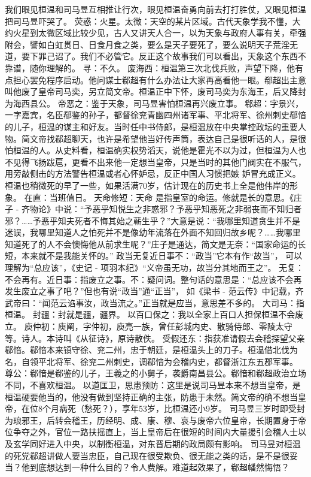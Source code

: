 \documentclass[]{book}
\begin{document}
我们眼见桓温和司马昱互相推让行次，眼见桓温奋勇向前去打打胜仗，又眼见桓温把司马昱吓哭了。
荧惑：火星。太微：天空的某片区域。古代天象学我不懂，大约火星到太微区域比较少见，古人又讲天人合一，以为天象与政府人事有关，牵强附会，譬如白虹贯日、日食月食之类，要么是天子要死了，要么说明天子荒淫无道，要下罪己诏了。我们不必管它。反正这个故事我们可以看出，天象这个东西不靠谱，随你理解的。
寻：不久。
废海西：桓温第三次北伐兵败，声望下降，他有点担心罢免程序启动。他问谋士郗超有什么办法让大家再高看他一眼。郗超出主意叫他废了皇帝司马奕，另立简文帝。桓温正中下怀，废司马奕为东海王，后又降封为海西县公。
帝恶之：鉴于天象，司马昱害怕桓温再兴废立事。
郗超：字景兴，一字嘉宾，名臣郗鉴的孙子，都督徐兖青幽四州诸军事、平北将军、徐州刺史郗愔的儿子，桓温的谋主和好友。当时任中书侍郎，是桓温放在中央掌控政坛的重要人物。简文帝找郗超聊天，也许是希望他当好传声筒，表达自己是很听话的人，是很怕桓温的人。从史料看，桓温确实权势滔天，说他是霍光不以为过，但桓温为人也不见得飞扬跋扈，更看不出来他一定想当皇帝，只是当时的其他门阀实在不服气，用旁敲侧击的方法警告桓温或者心怀妒忌，反正中国人习惯把嫉
妒冒充成正义。桓温也稍微死的早了一些，如果活满70岁，估计现在的历史书上全是他伟岸的形象。
在直：当班值日。 天命修短：天命 是指皇室的命运。修就是长的意思。《庄子 -
齐物论》中说：``予恶乎知悦生之非惑邪？予恶乎知恶死之非弱丧而不知归者邪？\ldots{}\ldots{}予恶乎知夫死者不悔其始之蕲生乎？''大意是说：``我哪里知道贪生并不是迷误，我哪里知道人之怕死并不是像幼年流落在外面不知回归故乡呢？\ldots{}\ldots{}我哪里知道死了的人不会懊悔他从前求生呢？''庄子是通达，简文是无奈：``国家命运的长短，本来就不是我能关怀的。''
政当无复近日事不：``政当''它本有作``故当''，
可以理解为``总应该''，《史记 -
项羽本纪》``义帝虽无功，故当分其地而王之''。
无复：不会再有。近日事：指废立之事。不：疑问词。整句话的意思是：``总应该不会再发生废立之事了吧？''但也有说``政当''通``正当''，
如《梁书 -
范云传》中记载，齐武帝曰：``闻范云谄事汝，政当流之。''正当就是应当，意思差不多的。
大司马：指桓温。 封疆：封就是疆，疆界。
以百口保之：我以全家上百口人担保桓温不会废立。
庾仲初：庾阐，字仲初，庾亮一族，曾任彭城内史、散骑侍郎、零陵太守等。诗人。本诗叫《从征诗》，原诗散佚。
受假还东：指获准请假去会稽探望父亲郗愔。郗愔本来镇守徐、兖二州，忠于朝廷，是桓温头上的刀子。桓温借北伐为名，自领平北将军、徐兖二州刺史，调郗愔为会稽内史，都督浙江东五郡军事。
尊公：郗愔是郗鉴的儿子，王羲之的小舅子，袭爵南昌县公。郗愔和郗超政治立场不同，不喜欢桓温。
以道匡卫，思患预防：这里是说司马昱本来不想当皇帝，是桓温硬要他当的，他没有做到坚持正确的主张，防患于未然。简文帝的确不想当皇帝，在位8个月病死（愁死？），享年53岁，比桓温还小9岁。
司马昱三岁时即受封为琅邪王，后转会稽王，历经明、成、康、穆、哀与废帝六位皇帝，长期置身于帝位争夺之外，官位一路扶摇直上，当上皇帝后在很短的时间内大量援引会稽人士以及玄学同好进入中央，以制衡桓温，对东晋后期的政局颇有影响。
司马昱对桓温的死党郗超讲做人要当忠臣，自己现在很受欺负、很无能之类的话，是不是很妥当？他到底想达到一种什么目的？令人费解。难道起效果了，郗超幡然悔悟？
\end{document}
